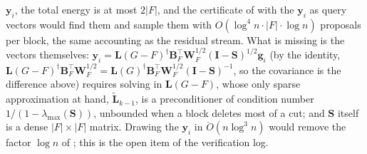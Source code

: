 \documentclass[11pt]{article}
\theoremstyle{remark}
\newcommand{\BB}{\mathbf B}
\renewcommand{\gg}{{\mathbf g}}
\newcommand{\II}{\mathbf I}
\newcommand{\LL}{\mathbf L}
\newcommand{\LLtil}{{\widetilde{\LL}}}
\newcommand{\SSS}{\mathbf S}
\newcommand{\WW}{\mathbf W}
\newcommand{\yy}{\mathbf y}
\newcommand{\Odouble}{\ddot{O}}
\begin{document}
$\yy_i$, the total energy is at most $2|F|$, and the certificate of
 with the $\yy_i$ as query vectors would find them and
sample them with $O(\log^{4}n\cdot|F|\cdot\log n)$ proposals per block, the
same accounting as the residual stream.
What is missing is the vectors themselves: $\yy_i=\LL(G-F)^{\dag}\BB_F^{\top}\WW_F^{1/2}(\II-\SSS)^{1/2}\gg_i$
(by the identity, $\LL(G-F)^{\dag}\BB_F^{\top}\WW_F^{1/2}=\LL(G)^{\dag}\BB_F^{\top}\WW_F^{1/2}(\II-\SSS)^{-1}$, so the covariance is the difference above)
requires solving in $\LL(G-F)$, whose only sparse approximation at hand,
$\LLtil_{k-1}$, is a preconditioner of condition number $1/(1-\lambda_{\max}(\SSS))$,
unbounded when a block deletes most of a cut; and $\SSS$ itself is a dense
$|F|\times|F|$ matrix.
Drawing the $\yy_i$ in $\Odouble(n\log^{3}n)$ would remove the factor
$\log n$ of ; this is the open item of the verification
log.
\end{document}
